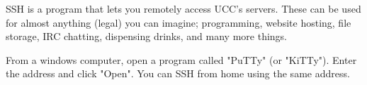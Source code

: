 SSH is a program that lets you remotely access UCC's servers. These can be used for almost anything (legal) you can imagine; programming, website hosting, file storage, IRC chatting, dispensing drinks, and many more things.


From a windows computer, open a program called "PuTTy" (or "KiTTy"). Enter the address  and click "Open". You can SSH from home using the same address. %








